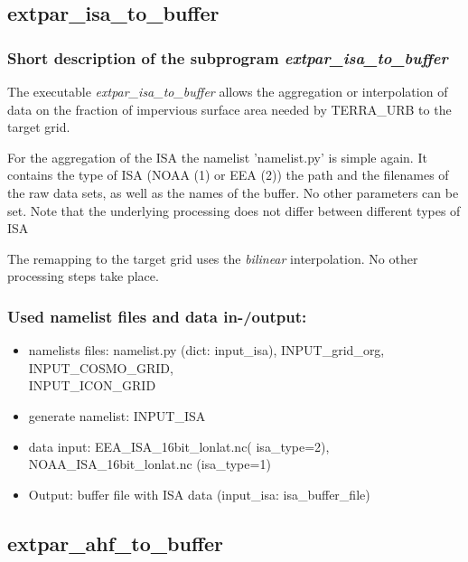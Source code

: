 \documentclass[a4paper,10pt,DIV14,BCOR1cm,titlepage,twoside]{scrartcl}
\begin{document}
\subsection{extpar\_isa\_to\_buffer}\label{extpar_isa_to_buffer}
\subsubsection{Short description of the subprogram \textit{extpar\_isa\_to\_buffer}}
The executable \textit{extpar\_isa\_to\_buffer} allows the aggregation or interpolation of data on the fraction of impervious surface area needed by TERRA\_URB to the target grid. \par\medskip\noindent
For the aggregation of the ISA the namelist 'namelist.py' is simple again. It contains the type of ISA (NOAA (1) or EEA (2)) the path and the filenames of the raw data sets, as well as the names of the buffer. No other parameters can be set. Note that the underlying processing does not differ between different types of ISA \par\medskip\noindent

The remapping to the target grid uses the \textit{bilinear} interpolation. No other processing steps take place. 

\subsubsection{Used namelist files and data in-/output:}
\begin{itemize}
 \item namelists files: namelist.py (dict: input\_isa), INPUT\_grid\_org, INPUT\_COSMO\_GRID, \\
       INPUT\_ICON\_GRID
 \item generate namelist: INPUT\_ISA
 \item data input: EEA\_ISA\_16bit\_lonlat.nc( isa\_type=2), NOAA\_ISA\_16bit\_lonlat.nc (isa\_type=1)
 \item Output: buffer file with ISA data (input\_isa: isa\_buffer\_file)
\end{itemize}

\subsection{extpar\_ahf\_to\_buffer}\label{extpar_ahf_to_buffer}
\end{document}
